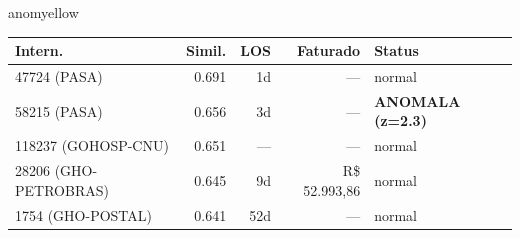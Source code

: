 \documentclass[a4paper,10pt]{article}
\begin{document}
\begin{anomalycard}[Internacao 167043 | GHO-PETROBRAS | MODERADO (z=2.26)]{anomyellow}
\begin{tabular}{l r r r l}\toprule\textbf{Intern.} & \textbf{Simil.} & \textbf{LOS} & \textbf{Faturado} & \textbf{Status} \\\midrule
47724 (PASA) & 0.691 & 1d & --- & \textcolor{jcubeblue}{normal} \\
58215 (PASA) & 0.656 & 3d & --- & \textcolor{anomred}{\textbf{ANOMALA (z=2.3)}} \\
118237 (GOHOSP-CNU) & 0.651 & --- & --- & \textcolor{jcubeblue}{normal} \\
28206 (GHO-PETROBRAS) & 0.645 & 9d & R\$ 52.993,86 & \textcolor{jcubeblue}{normal} \\
1754 (GHO-POSTAL) & 0.641 & 52d & --- & \textcolor{jcubeblue}{normal} \\
\bottomrule\end{tabular}


\end{anomalycard}

\newpage
\end{document}
